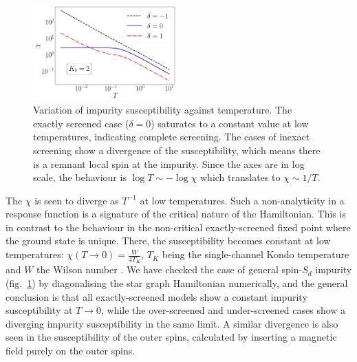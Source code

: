 \documentclass[reprint,prb,superscriptaddress]{revtex4-2}
\begin{document}
\begin{figure}[!htpb]
\centering
\includegraphics[width=0.49\textwidth]{CentralFieldChiPowerlaw.pdf}
\caption{Variation of impurity susceptibility against temperature. The exactly screened case ($\delta=0$) saturates to a constant value at low temperatures, indicating complete screening. The cases of inexact screening show a divergence of the susceptibility, which means there is a remnant local spin at the impurity. Since the axes are in log scale, the behaviour is $\log T \sim -\log \chi$ which translates to $\chi \sim 1/T$.  }
\label{fig:suseptibility_impurity}
\end{figure}

The \(\chi\) is seen to diverge as \(T^{-1}\) at low temperatures.
Such a non-analyticity in a response function is {\color{red}a signature of the critical nature of the Hamiltonian. This is} in contrast to the behaviour in the {\color{red}non-critical} exactly-screened fixed point where the ground state is unique.
There, the susceptibility becomes constant at low temperatures: \(\chi(T\to 0) = \frac{W}{4 T_K}\), \(T_K\) being the single-channel Kondo temperature and \(W\) the Wilson number \cite{wilson1975renormalization,nozieres1974fermi,bullaNRGreview,kondo_urg}.
We have checked the case of general spin-\(S_{d}\) impurity (fig.~\ref{fig:suseptibility_impurity}) by {\color{blue}diagonalising the star graph Hamiltonian numerically}, and the general conclusion is that all exactly-screened models show a constant impurity susceptibility at \(T \to 0\), while the over-screened and under-screened cases show a diverging impurity susceptibility in the same limit.
A similar divergence is also seen in the susceptibility of the outer spins, calculated by inserting a magnetic field purely on the outer spins.
\end{document}
